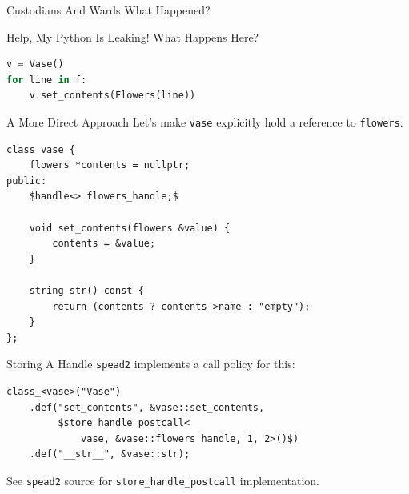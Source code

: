 \documentclass{beamer}
\def\linlinec{\lstinline[basicstyle=\ttfamily,language=c++]}
\begin{document}
\begin{frame}{Custodians And Wards}
  What Happened?

  \begin{figure}
  \end{figure}
\end{frame}

\begin{frame}[fragile=singleslide]{Help, My Python Is Leaking!}
  What Happens Here?
  \begin{lstlisting}[language=python]
v = Vase()
for line in f:
    v.set_contents(Flowers(line))
  \end{lstlisting}
\end{frame}

\begin{frame}[fragile=singleslide]{A More Direct Approach}
  Let's make \linlinec"vase" explicitly hold a reference to
  \linlinec"flowers".
  \begin{lstlisting}[language={[extra]c++}]
class vase {
    flowers *contents = nullptr;
public:
    $handle<> flowers_handle;$

    void set_contents(flowers &value) {
        contents = &value;
    }

    string str() const {
        return (contents ? contents->name : "empty");
    }
};
  \end{lstlisting}
\end{frame}

\begin{frame}[fragile=singleslide]{Storing A Handle}
  \texttt{spead2} implements a call policy for this:
  \begin{lstlisting}[language={[extra]c++}]
class_<vase>("Vase")
    .def("set_contents", &vase::set_contents,
         $store_handle_postcall<
             vase, &vase::flowers_handle, 1, 2>()$)
    .def("__str__", &vase::str);
  \end{lstlisting}
  See \texttt{spead2} source for \linlinec"store_handle_postcall" implementation.
\end{frame}
\end{document}
